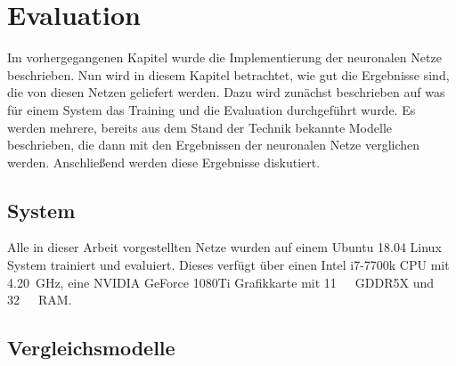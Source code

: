 \chapter{Evaluation}
\label{cap:Eval}

Im vorhergegangenen Kapitel wurde die Implementierung der neuronalen Netze beschrieben.
Nun wird in diesem Kapitel betrachtet, wie gut die Ergebnisse sind, die von diesen Netzen geliefert werden.
Dazu wird zunächst beschrieben auf was für einem System das Training und die Evaluation durchgeführt wurde.
Es werden mehrere, bereits aus dem Stand der Technik bekannte Modelle beschrieben, die dann mit den Ergebnissen der neuronalen Netze 
verglichen werden.
Anschließend werden diese Ergebnisse diskutiert.

\section{System}

Alle in dieser Arbeit vorgestellten Netze wurden auf einem Ubuntu 18.04 Linux System trainiert und evaluiert.
Dieses verfügt über einen Intel i7-7700k CPU mit \SI{4.20}{\giga\hertz}, eine NVIDIA GeForce 1080Ti Grafikkarte mit \SI{11}{\giga\byte}~GDDR5X
und \SI{32}{\giga\byte}~RAM. 


\section{Vergleichsmodelle}



